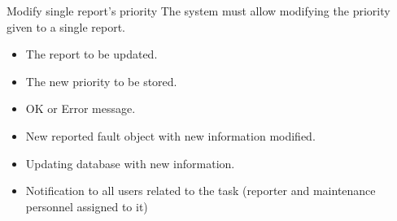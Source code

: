 \begin{requirement}{Modify single report's priority}
\reqdesc The system must allow modifying the priority given to a single report. 
\reqin \begin{itemize}
\item The report to be updated.
\item The new priority to be stored.
\end{itemize}
\reqout \begin{itemize}
	\item OK or Error message.
	\item New reported fault object with new information modified.
	\item Updating database with new information.
	\item Notification to all users related to the task (reporter and maintenance personnel assigned to it)
\end{itemize}

\end{requirement}





